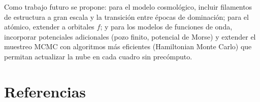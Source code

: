 \documentclass[12pt, a4paper]{article}
\begin{document}
Como trabajo futuro se propone: para el modelo cosmológico, incluir
filamentos de estructura a gran escala y la transición entre épocas de
dominación; para el atómico, extender a orbitales $f$; y para los
modelos de funciones de onda, incorporar potenciales adicionales
(pozo finito, potencial de Morse) y extender el muestreo MCMC con
algoritmos más eficientes (Hamiltonian Monte Carlo) que permitan
actualizar la nube en cada cuadro sin precómputo.

\section*{Referencias}



\end{document}
